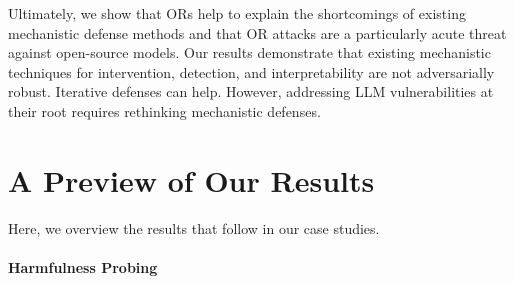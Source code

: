 \documentclass{article}
\begin{document}
Ultimately, we show that ORs help to explain the shortcomings of existing mechanistic defense methods and that OR attacks are a particularly acute threat against open-source models.
Our results demonstrate that existing mechanistic techniques for intervention, detection, and interpretability are not adversarially robust.
Iterative defenses can help. 
However, addressing LLM vulnerabilities at their root requires rethinking mechanistic defenses. 






\section{A Preview of Our Results}


Here, we overview the results that follow in our case studies.

\paragraph{Harmfulness Probing}
\end{document}
